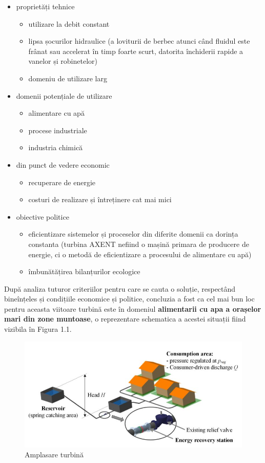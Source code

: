 \begin{itemize}
	\item proprietăți tehnice
		\begin{itemize}
			\item utilizare la debit constant
			\item lipsa șocurilor hidraulice (a loviturii de berbec atunci când fluidul este frânat sau accelerat în timp foarte scurt, datorita închiderii rapide a vanelor și robinetelor)
			\item domeniu de utilizare larg
		\end{itemize}
	\item domenii potențiale de utilizare
		\begin{itemize}
			\item alimentare cu apă
			\item procese industriale
			\item industria chimică
		\end{itemize}
	\item din punct de vedere economic
		\begin{itemize}
			\item recuperare de energie
			\item costuri de realizare și întreținere cat mai mici
		\end{itemize}
	\item obiective politice
		\begin{itemize}
			\item eficientizare sistemelor și proceselor din diferite domenii ca dorința constanta (turbina AXENT nefiind o mașină primara de producere de energie, ci o metodă de eficientizare a procesului de alimentare cu apă)
			\item îmbunătățirea bilanțurilor ecologice
		\end{itemize}	
\end{itemize}

După analiza tuturor criteriilor pentru care se cauta o soluție, respectând bineînțeles și condițiile economice și politice, concluzia a fost ca cel mai bun loc pentru aceasta viitoare turbină este în domeniul \textbf{alimentarii cu apa a orașelor mari din zone muntoase}, o reprezentare schematica a acestei situații fiind vizibila în Figura 1.1.

\begin{figure}[h!]
	\centering
	\includegraphics[scale=0.7]{figures/amplasare_turbina.jpg}
	\caption{Amplasare turbină \cite{andolfatto2016simulation}}
	\label{Amplasare turbin\u{a}}
\end{figure}

